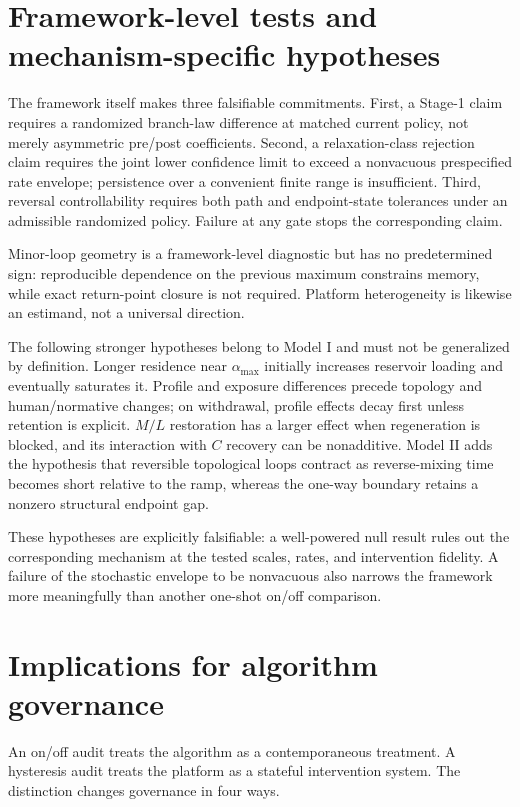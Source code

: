 \documentclass[pdflatex,sn-mathphys-num]{sn-jnl}
\newcommand{\alphamax}{\alpha_{\max}}
\begin{document}
\section{Framework-level tests and mechanism-specific hypotheses}

The framework itself makes three falsifiable commitments. First, a Stage-1 claim requires a randomized branch-law difference at matched current policy, not merely asymmetric pre/post coefficients. Second, a relaxation-class rejection claim requires the joint lower confidence limit to exceed a nonvacuous prespecified rate envelope; persistence over a convenient finite range is insufficient. Third, reversal controllability requires both path and endpoint-state tolerances under an admissible randomized policy. Failure at any gate stops the corresponding claim.

Minor-loop geometry is a framework-level diagnostic but has no predetermined sign: reproducible dependence on the previous maximum constrains memory, while exact return-point closure is not required. Platform heterogeneity is likewise an estimand, not a universal direction.

The following stronger hypotheses belong to Model I and must not be generalized by definition. Longer residence near $\alphamax$ initially increases reservoir loading and eventually saturates it. Profile and exposure differences precede topology and human/normative changes; on withdrawal, profile effects decay first unless retention is explicit. $M/L$ restoration has a larger effect when regeneration is blocked, and its interaction with $C$ recovery can be nonadditive. Model II adds the hypothesis that reversible topological loops contract as reverse-mixing time becomes short relative to the ramp, whereas the one-way boundary retains a nonzero structural endpoint gap.

These hypotheses are explicitly falsifiable: a well-powered null result rules out the corresponding mechanism at the tested scales, rates, and intervention fidelity. A failure of the stochastic envelope to be nonvacuous also narrows the framework more meaningfully than another one-shot on/off comparison.

\section{Implications for algorithm governance}

An on/off audit treats the algorithm as a contemporaneous treatment. A hysteresis audit treats the platform as a stateful intervention system. The distinction changes governance in four ways.
\end{document}
